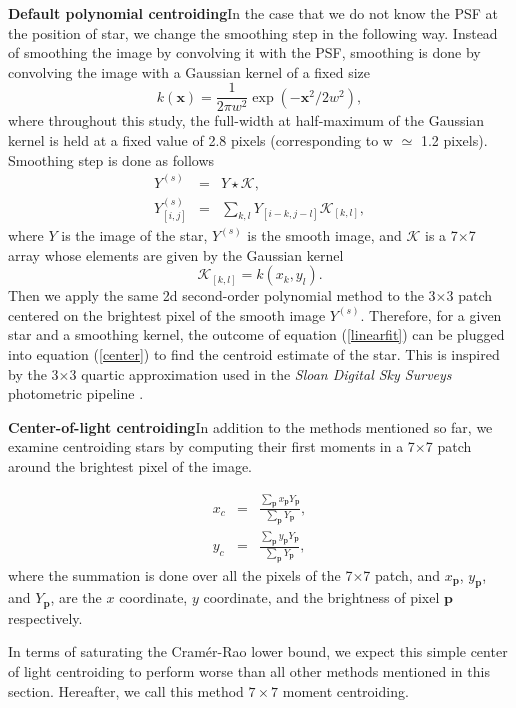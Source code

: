 \documentclass[12pt, preprint]{aastex}
\newcommand{\beq}{\begin{equation}}
\newcommand{\eeq}{\end{equation}}
\begin{document}
\item{\bf Default polynomial centroiding}\quad In the case that 
we do not know the PSF at the position of star, we change 
the smoothing step in the following way. Instead of smoothing the image 
by convolving it with the PSF, smoothing is done by convolving the image 
with a Gaussian kernel of a fixed size 
\beq
k(\mathbf{x}) = \frac{1}{2\pi w^2}\exp(-\mathbf{x}^{2}/2w^{2}),
\eeq
where throughout this study, the full-width at half-maximum of the Gaussian kernel is held at
a fixed value of 2.8 pixels (corresponding to w $\simeq$ 1.2 pixels). Smoothing step is done as follows
\begin{eqnarray}
Y^{(s)} &=& Y \star \mathcal{K}, \\
Y^{(s)}_{[i,j]} &=& \sum_{k,l}Y_{[i-k,j-l]}\mathcal{K}_{[k,l]},
\end{eqnarray}
where $Y$ is the image of the star, $Y^{(s)}$ is the smooth image, and $\mathcal{K}$ is a 7$\times$7 
array whose elements are given by the Gaussian kernel
\beq
\mathcal{K}_{[k,l]} = k(x_{k},y_{l}).
\eeq 
Then we apply the same 2d second-order polynomial method to the 3$\times$3 patch centered on the brightest
pixel of the smooth image $Y^{(s)}$. Therefore, for a given star and a smoothing kernel,
the outcome of equation (\ref{linearfit}) can be
plugged into equation (\ref{center}) to find the centroid estimate
of the star. This is inspired by the 3$\times$3 quartic approximation 
used in the \textsl{Sloan Digital Sky Surveys} photometric pipeline \citep{sdss}.

\item {\bf Center-of-light centroiding}\quad In addition to the methods 
mentioned so far, we examine centroiding stars by computing their first moments
in a 7$\times$7 patch around the brightest pixel of the image.

\begin{eqnarray}
x_{c} &=& \frac{\sum_\mathbf{p}x_{\mathbf{p}}Y_{\mathbf{p}}}{\sum_\mathbf{p}Y_{\mathbf{p}}}, \\
y_{c} &=& \frac{\sum_\mathbf{p}y_{\mathbf{p}}Y_{\mathbf{p}}}{\sum_\mathbf{p}Y_{\mathbf{p}}},
\end{eqnarray}
where the summation is done over all the pixels of the 7$\times$7 patch, and $x_{\mathbf{p}}$, 
$y_{\mathbf{p}}$, and $Y_{\mathbf{p}}$, are the $x$ coordinate, $y$ coordinate, and the brightness
of pixel $\mathbf{p}$ respectively.

In terms of saturating the Cram\'{e}r-Rao lower bound, we expect this simple 
center of light centroiding to perform worse than all other methods mentioned in 
this section. Hereafter, we call this method $7\times7$ moment centroiding.
\end{document}
